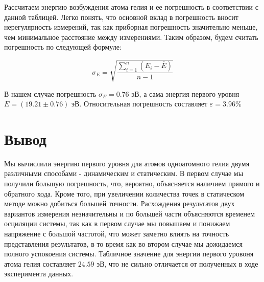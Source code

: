 \documentclass[12pt]{article}
\begin{document}
  Рассчитаем энергию возбуждения атома гелия и ее погрешность в соответствии с данной таблицей. Легко понять, что
  основной вклад в погрешность вносит нерегулярность измерений, так как приборная погрешность значительно меньше, чем
  минимальное расстояние между измерениями. Таким образом, будем считать погрешность по следующей формуле:

  $$
    \sigma_E = \sqrt{\frac{\sum\limits_{i = 1}^n \left(E_i - \overline{E}\right)}{n - 1}}
  $$

  В нашем случае погрешность $\sigma_E = 0.76$ эВ, а сама энергия первого уровня $E = (19.21 \pm 0.76)$ эВ.
  Относительная погрешность составляет $\varepsilon = 3.96 \%$

\section{Вывод}

  Мы вычислили энергию первого уровня для атомов одноатомного гелия двумя различными способами - динамическим и
  статическим. В первом случае мы получили большую погрешность, что, вероятно, объясняется наличием прямого и
  обратного хода. Кроме того, при увеличении количества точек в статическом методе можно добиться большей точности.
  Расхождения результатов двух вариантов измерения незначительны и по большей части объясняются временем осциляции
  системы, так как в первом случае мы повышаем и понижаем напряжение с большой частотой, что может заметно
  влиять на точность представления результатов, в то время как во втором случае мы дожидаемся полного успокоения
  системы. Табличное значение для энергии первого уровоня атома гелия составляет $24.59$ эВ, что не сильно
  отличается от полученных в ходе эксперимента данных.
\end{document}
